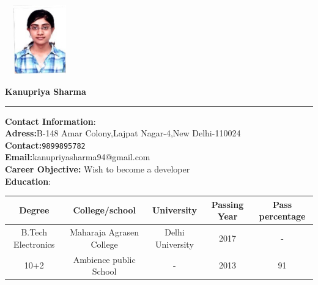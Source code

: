 \documentclass[10pt,a4paper]{article}
\begin{document}
	
\begin{flushright}
\includegraphics[width=3cm, height=3cm]{Untitled}
\end{flushright}

\textbf{\huge \bigskip Kanupriya Sharma}
\hrule
\large
\begin{flushleft}
	
	\textbf{Contact Information}:\\
	\textbf{Adress:}B-148 Amar Colony,Lajpat Nagar-4,New Delhi-110024\\
	\textbf{Contact:}\texttt{9899895782}\\
	\textbf{Email:}kanupriyasharma94@gmail.com\\ 
	\textbf{Career Objective:} Wish to become a  developer\\
	
	\textbf{\bigskip  Education}:\\
	
	\begin{tabular}{|c|c|c|c|c|}
		\hline \textbf{ Degree}  & \textbf{College/school}  & \textbf{University} & \textbf{Passing Year} & \textbf{ Pass percentage} \\ 
		\hline B.Tech Electronics & Maharaja Agrasen College  & Delhi University & 2017 & - \\ 
		\hline 
		10+2 & Ambience public School & - & 2013 & 91 \\
		\hline
		
	\end{tabular} 
	
\end{flushleft}

 
\end{document}
